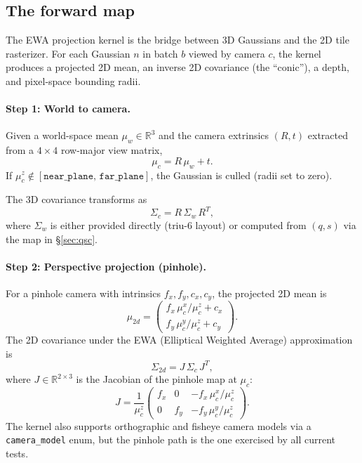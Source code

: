 \documentclass[11pt]{article}
\newcommand{\R}{\mathbb{R}}
\begin{document}
\subsection{The forward map}

The EWA projection kernel is the bridge between 3D Gaussians and the
2D tile rasterizer. For each Gaussian $n$ in batch $b$ viewed by
camera $c$, the kernel produces a projected 2D mean, an inverse 2D
covariance (the ``conic''), a depth, and pixel-space bounding radii.

\paragraph{Step 1: World to camera.}
Given a world-space mean $\mu_w \in \R^3$ and the camera extrinsics
$(R, t)$ extracted from a $4 \times 4$ row-major view matrix,
\begin{equation}
  \mu_c = R\, \mu_w + t.
  \label{eq:posw2c}
\end{equation}
If $\mu_c^z \notin [\texttt{near\_plane},\, \texttt{far\_plane}]$,
the Gaussian is culled (radii set to zero).

The 3D covariance transforms as
\begin{equation}
  \Sigma_c = R\, \Sigma_w\, R^T,
  \label{eq:covarw2c}
\end{equation}
where $\Sigma_w$ is either provided directly (triu-6 layout) or
computed from $(q, s)$ via the map in \S\ref{sec:qsc}.

\paragraph{Step 2: Perspective projection (pinhole).}
For a pinhole camera with intrinsics $f_x, f_y, c_x, c_y$, the
projected 2D mean is
\begin{equation}
  \mu_{2d} = \begin{pmatrix}
    f_x\, \mu_c^x / \mu_c^z + c_x \\
    f_y\, \mu_c^y / \mu_c^z + c_y
  \end{pmatrix}.
  \label{eq:persp-mean}
\end{equation}
The 2D covariance under the EWA (Elliptical Weighted Average)
approximation is
\begin{equation}
  \Sigma_{2d} = J\, \Sigma_c\, J^T,
  \label{eq:ewa}
\end{equation}
where $J \in \R^{2 \times 3}$ is the Jacobian of the pinhole map at
$\mu_c$:
\begin{equation}
  J = \frac{1}{\mu_c^z}
  \begin{pmatrix}
    f_x & 0 & -f_x\, \mu_c^x / \mu_c^z \\
    0 & f_y & -f_y\, \mu_c^y / \mu_c^z
  \end{pmatrix}.
  \label{eq:persp-jacobian}
\end{equation}
The kernel also supports orthographic and fisheye camera models via
a \texttt{camera\_model} enum, but the pinhole path is the one
exercised by all current tests.
\end{document}
